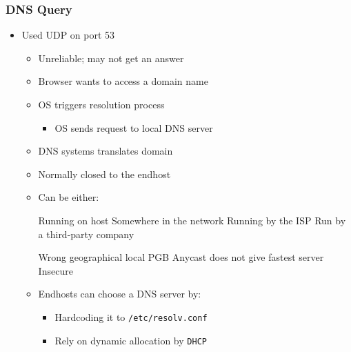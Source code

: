 \subsubsection{DNS Query}
\begin{itemize}
    \item Used UDP on port 53
        \begin{itemize}
            \item Unreliable; may not get an answer
        \end{itemize}
        \begin{itemize}
            \item Browser wants to access a domain name
            \item OS triggers resolution process
                \begin{itemize}
                    \item OS sends request to local DNS server
                \end{itemize}
            \item DNS systems translates domain
        \end{itemize}
        \begin{itemize}
            \item Normally closed to the endhost
            \item Can be either:
                \begin{itemize}
                     Running on host
                     Somewhere in the network
                     Running by the ISP
                     Run by a third-party company
                        \begin{itemize}
                            \icon Wrong geographical local
                            \icon PGB Anycast does not give fastest server
                            \icon Insecure
                        \end{itemize}
                \end{itemize}
            \item Endhosts can choose a DNS server by:
                \begin{itemize}
                    \item Hardcoding it to \verb+/etc/resolv.conf+
                    \item Rely on dynamic allocation by \verb+DHCP+
                \end{itemize}

\end{itemize}
\end{itemize}
